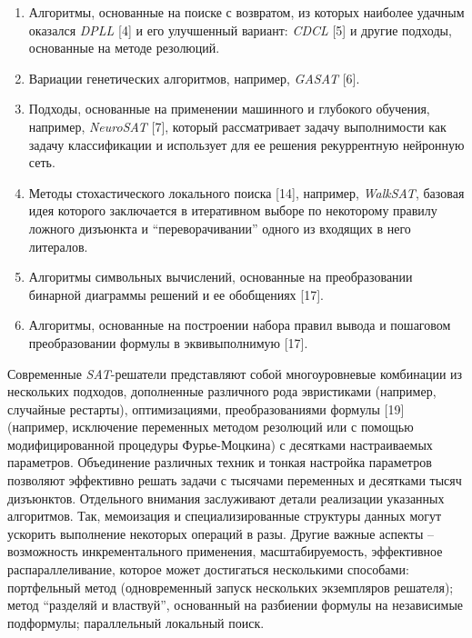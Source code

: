 \begin{enumerate}[leftmargin=1cm,topsep=0pt,itemsep=-1ex,partopsep=1ex,parsep=1ex,label=\arabic{*}.]

\item
Алгоритмы, основанные на поиске с возвратом, из которых наиболее удачным оказался \textit{DPLL} [4] и его улучшенный вариант: \textit{CDCL} [5] и другие подходы, основанные на методе резолюций.

\item
Вариации генетических алгоритмов, например, \textit{GASAT} [6].

\item
Подходы, основанные на применении машинного и глубокого обучения, например, \textit{NeuroSAT} [7], который рассматривает задачу выполнимости как задачу классификации и использует для ее решения рекуррентную нейронную сеть.

\item
Методы стохастического локального поиска [14], например, \textit{WalkSAT}, базовая идея которого заключается в итеративном выборе по некоторому правилу ложного дизъюнкта и \enquote{переворачивании} одного из входящих в него литералов.

\item
Алгоритмы символьных вычислений, основанные на преобразовании бинарной диаграммы решений и ее обобщениях [17].

\item
Алгоритмы, основанные на построении набора правил вывода и пошаговом преобразовании формулы в эквивыполнимую [17].

\end{enumerate}


Современные \textit{SAT}-решатели представляют собой многоуровневые комбинации из нескольких подходов, дополненные различного рода эвристиками (например, случайные рестарты), оптимизациями, преобразованиями формулы [19] (например, исключение переменных методом резолюций или с помощью модифицированной процедуры Фурье-Моцкина) с десятками настраиваемых параметров. Объединение различных техник и тонкая настройка параметров позволяют эффективно решать задачи с тысячами переменных и десятками тысяч дизъюнктов. Отдельного внимания заслуживают детали реализации указанных алгоритмов. Так, мемоизация и специализированные структуры данных могут ускорить выполнение некоторых операций в разы. Другие важные аспекты – возможность инкрементального применения, масштабируемость, эффективное распараллеливание, которое может достигаться несколькими способами: портфельный метод (одновременный запуск нескольких экземпляров решателя); метод \enquote{разделяй и властвуй}, основанный на разбиении формулы на независимые подформулы; параллельный локальный поиск.

